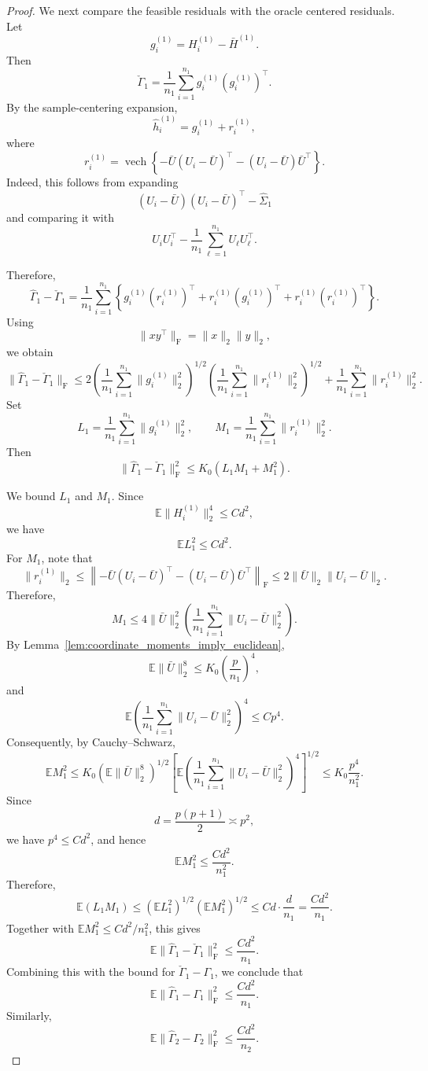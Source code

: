 \documentclass[
  12pt]{article}
\theoremstyle{plain}
\theoremstyle{definition}
\theoremstyle{remark}
\begin{document}
\begin{proof}
We next compare the feasible residuals with the oracle centered residuals.
Let
\[
g_i^{(1)}
=
H_i^{(1)}-\bar H^{(1)}.
\]
Then
\[
\check\Gamma_1
=
\frac1{n_1}\sum_{i=1}^{n_1}
g_i^{(1)}(g_i^{(1)})^\top.
\]
By the sample-centering expansion,
\[
\widehat h_i^{(1)}
=
g_i^{(1)}+r_i^{(1)},
\]
where
\[
r_i^{(1)}
=
\operatorname{vech}
\left\{
-\bar U(U_i-\bar U)^\top
-
(U_i-\bar U)\bar U^\top
\right\}.
\]
Indeed, this follows from expanding
\[
(U_i-\bar U)(U_i-\bar U)^\top-\widehat\Sigma_1
\]
and comparing it with
\[
U_iU_i^\top-\frac1{n_1}\sum_{\ell=1}^{n_1}U_\ell U_\ell^\top.
\]

Therefore,
\[
\widehat\Gamma_1-\check\Gamma_1
=
\frac1{n_1}\sum_{i=1}^{n_1}
\left\{
g_i^{(1)}(r_i^{(1)})^\top
+
r_i^{(1)}(g_i^{(1)})^\top
+
r_i^{(1)}(r_i^{(1)})^\top
\right\}.
\]
Using
\[
\|xy^\top\|_{\mathrm F}=\|x\|_2\|y\|_2,
\]
we obtain
\[
\|\widehat\Gamma_1-\check\Gamma_1\|_{\mathrm F}
\le
2
\left(
\frac1{n_1}\sum_{i=1}^{n_1}\|g_i^{(1)}\|_2^2
\right)^{1/2}
\left(
\frac1{n_1}\sum_{i=1}^{n_1}\|r_i^{(1)}\|_2^2
\right)^{1/2}
+
\frac1{n_1}\sum_{i=1}^{n_1}\|r_i^{(1)}\|_2^2.
\]
Set
\[
L_1=
\frac1{n_1}\sum_{i=1}^{n_1}\|g_i^{(1)}\|_2^2,
\qquad
M_1=
\frac1{n_1}\sum_{i=1}^{n_1}\|r_i^{(1)}\|_2^2.
\]
Then
\[
\|\widehat\Gamma_1-\check\Gamma_1\|_{\mathrm F}^2
\le
K_0(L_1M_1+M_1^2).
\]

We bound \(L_1\) and \(M_1\). Since
\[
\mathbb E\|H_i^{(1)}\|_2^4\le Cd^2,
\]
we have
\[
\mathbb E L_1^2\le Cd^2.
\]
For \(M_1\), note that
\[
\|r_i^{(1)}\|_2
\le
\left\|
-\bar U(U_i-\bar U)^\top
-
(U_i-\bar U)\bar U^\top
\right\|_{\mathrm F}
\le
2\|\bar U\|_2\|U_i-\bar U\|_2.
\]
Therefore,
\[
M_1
\le
4\|\bar U\|_2^2
\left(
\frac1{n_1}\sum_{i=1}^{n_1}\|U_i-\bar U\|_2^2
\right).
\]
By Lemma~\ref{lem:coordinate_moments_imply_euclidean},
\[
\mathbb E\|\bar U\|_2^8
\le
K_0\left(\frac{p}{n_1}\right)^4,
\]
and
\[
\mathbb E
\left(
\frac1{n_1}\sum_{i=1}^{n_1}\|U_i-\bar U\|_2^2
\right)^4
\le
Cp^4.
\]
Consequently, by Cauchy--Schwarz,
\[
\mathbb E M_1^2
\le
K_0
\left(\mathbb E\|\bar U\|_2^8\right)^{1/2}
\left[
\mathbb E
\left(
\frac1{n_1}\sum_{i=1}^{n_1}\|U_i-\bar U\|_2^2
\right)^4
\right]^{1/2}
\le
K_0\frac{p^4}{n_1^2}.
\]
Since
\[
d=\frac{p(p+1)}2\asymp p^2,
\]
we have \(p^4\le Cd^2\), and hence
\[
\mathbb E M_1^2
\le
\frac{Cd^2}{n_1^2}.
\]
Therefore,
\[
\mathbb E(L_1M_1)
\le
(\mathbb E L_1^2)^{1/2}
(\mathbb E M_1^2)^{1/2}
\le
Cd\cdot \frac d{n_1}
=
\frac{Cd^2}{n_1}.
\]
Together with \(\mathbb E M_1^2\le Cd^2/n_1^2\), this gives
\[
\mathbb E\|\widehat\Gamma_1-\check\Gamma_1\|_{\mathrm F}^2
\le
\frac{Cd^2}{n_1}.
\]
Combining this with the bound for
\(\check\Gamma_1-\Gamma_1\), we conclude that
\[
\mathbb E\|\widehat\Gamma_1-\Gamma_1\|_{\mathrm F}^2
\le
\frac{Cd^2}{n_1}.
\]
Similarly,
\[
\mathbb E\|\widehat\Gamma_2-\Gamma_2\|_{\mathrm F}^2
\le
\frac{Cd^2}{n_2}.
\]


\end{proof}
\end{document}

